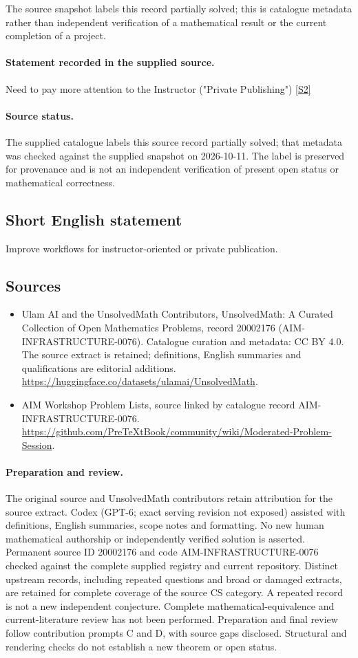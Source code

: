 \documentclass[11pt]{article}
\begin{document}
The source snapshot labels this record partially solved; this is catalogue metadata rather than independent verification of a mathematical result or the current completion of a project.
\paragraph{Statement recorded in the supplied source.}
Need to pay more attention to the Instructor ("Private Publishing") \href{https://github.com/PreTeXtBook/community/wiki/Moderated-Problem-Session}{[S2]}
\paragraph{Source status.}
The supplied catalogue labels this source record partially solved; that metadata was checked against the supplied snapshot on 2026-10-11. The label is preserved for provenance and is not an independent verification of present open status or mathematical correctness.
\subsection{Short English statement}
Improve workflows for instructor-oriented or private publication.
\subsection{Sources}
\begin{itemize}
\item[S1] Ulam AI and the UnsolvedMath Contributors, UnsolvedMath: A Curated Collection of Open Mathematics Problems, record 20002176 (AIM-INFRASTRUCTURE-0076). Catalogue curation and metadata: CC BY 4.0. The source extract is retained; definitions, English summaries and qualifications are editorial additions.
\url{https://huggingface.co/datasets/ulamai/UnsolvedMath}.
\item[S2] AIM Workshop Problem Lists, source linked by catalogue record AIM-INFRASTRUCTURE-0076.
\url{https://github.com/PreTeXtBook/community/wiki/Moderated-Problem-Session}.
\end{itemize}
\paragraph{Preparation and review.}
The original source and UnsolvedMath contributors retain attribution for the source extract. Codex (GPT-6; exact serving revision not exposed) assisted with definitions, English summaries, scope notes and formatting. No new human mathematical authorship or independently verified solution is asserted. Permanent source ID 20002176 and code AIM-INFRASTRUCTURE-0076 checked against the complete supplied registry and current repository. Distinct upstream records, including repeated questions and broad or damaged extracts, are retained for complete coverage of the source CS category. A repeated record is not a new independent conjecture. Complete mathematical-equivalence and current-literature review has not been performed. Preparation and final review follow contribution prompts C and D, with source gaps disclosed. Structural and rendering checks do not establish a new theorem or open status.
\label{end:20002176}
\end{document}

